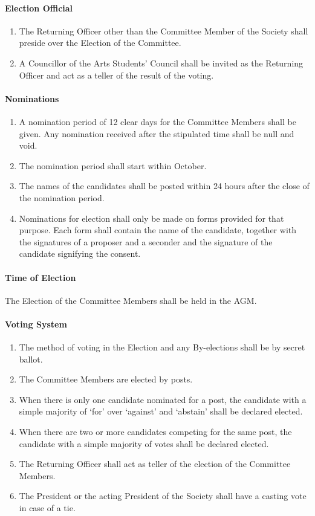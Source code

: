 \documentclass[11pt,a4paper,notitlepage]{article}
\begin{document}
	\paragraph{Election Official} 
		\begin{enumerate}
			\item The Returning Officer other than the Committee Member of the Society shall preside over the Election of the Committee. 
			\item A Councillor of the Arts Students' Council shall be invited as the Returning Officer and act as a teller of the result of the voting. 
		\end{enumerate}
	
	
	\paragraph{Nominations} 
		\begin{enumerate}
			\item A nomination period of 12 clear days for the Committee Members shall be given. Any nomination received after the stipulated time shall be null and void. 
			\item The nomination period shall start within October. 
			\item The names of the candidates shall be posted within 24 hours after the close of the nomination period. 
			\item Nominations for election shall only be made on forms provided for that purpose. Each form shall contain the name of the candidate, together with the signatures of a proposer and a seconder and the signature of the candidate signifying the consent. 
		\end{enumerate}
		
	
	
	\paragraph{Time of Election} 
	The Election of the Committee Members shall be held in the AGM. 
	
	\paragraph{Voting System} 
	\begin{enumerate}
		\item  The method of voting in the Election and any By-elections shall be by secret ballot. 
		\item The Committee Members are elected by posts. 
		\item When there is only one candidate nominated for a post, the candidate with a simple majority of ‘for' over ‘against' and ‘abstain' shall be declared elected. 
		\item When there are two or more candidates competing for the same post, the candidate with a simple majority of votes shall be declared elected. 
		\item The Returning Officer shall act as teller of the election of the Committee Members. 
		\item The President or the acting President of the Society shall have a casting vote in case of a tie. 
	\end{enumerate}
	
\end{document}
